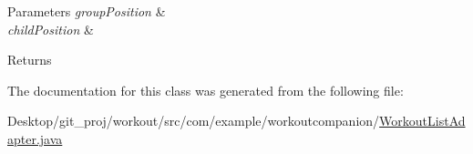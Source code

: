 \begin{DoxyParams}{Parameters}
{\em group\-Position} & \\
\hline
{\em child\-Position} & \\
\hline
\end{DoxyParams}
\begin{DoxyReturn}{Returns}

\end{DoxyReturn}


The documentation for this class was generated from the following file\-:\begin{DoxyCompactItemize}
\item 
Desktop/git\-\_\-proj/workout/src/com/example/workoutcompanion/\hyperlink{_workout_list_adapter_8java}{Workout\-List\-Adapter.\-java}\end{DoxyCompactItemize}
